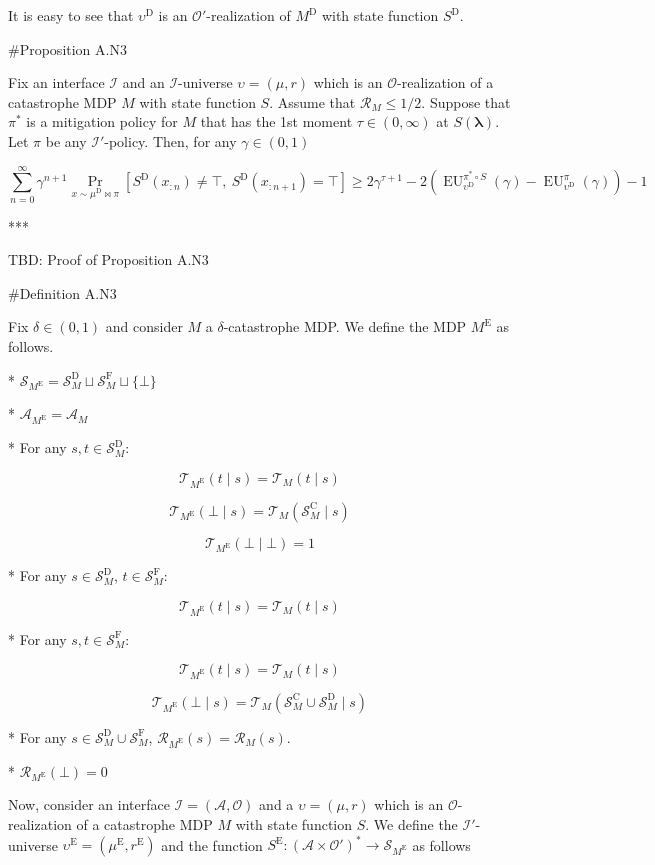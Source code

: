\documentclass[a4paper]{article}
\newcommand{\Comment}[1]{}
\newcommand{\AP}[1]{\left(#1\right)}
\newcommand{\AB}[1]{\left[#1\right]}
\newcommand{\Pa}[2]{\underset{#1}{\operatorname{Pr}}\AB{#2}}
\newcommand{\Estr}{\boldsymbol{\lambda}}
\newcommand{\M}{\xrightarrow{\textnormal{k}}}
\newcommand{\Ob}{\mathcal{O}}
\newcommand{\A}{\mathcal{A}}
\newcommand{\St}{\mathcal{S}}
\newcommand{\T}{\mathcal{T}}
\newcommand{\R}{\mathcal{R}}
\newcommand{\In}{\mathcal{I}}
\newcommand{\RMC}{\mathrm{C}}
\newcommand{\RMD}{\mathrm{D}}
\newcommand{\RME}{\mathrm{E}}
\newcommand{\RMF}{\mathrm{F}}
\newcommand{\SF}{\St^{\RMF}}
\newcommand{\SD}{\St^{\RMD}}
\newcommand{\SC}{\St^{\RMC}}
\newcommand{\MD}{M^{\RMD}}
\newcommand{\ME}{M^{\RME}}
\newcommand{\PD}{\pi^{\RMD}}
\newcommand{\UD}{\upsilon^{\RMD}}
\newcommand{\EU}{\operatorname{EU}}
\begin{document}
It is easy to see that $\UD$ is an $\Ob'$-realization of $\MD$ with state function $S^\RMD$.

\Comment{Given $\pi: \St_M \M \A_M$, we define $\PD: \St_{\MD} \M \A_M$ by

* For any $s \in \SD_M$, $\PD(s) = \pi(s)$.

* For $s \in \{\bot,\top\}$, $\PD(s)$ is arbitrary (because of how $\T_{\MD}$ is defined, the choice affects nothing).}

\#Proposition A.N3

Fix an interface $\In$ and an $\In$-universe $\upsilon=(\mu,r)$ which is an $\Ob$-realization of a catastrophe MDP $M$ with state function $S$. Assume that $\R_M \leq 1/2$. Suppose that $\pi^*$ is a mitigation policy for $M$ that has the 1st moment $\tau\in(0,\infty)$ at $S(\Estr)$. Let $\pi$ be any $\In'$-policy. Then, for any $\gamma\in(0,1)$

$$\sum_{n=0}^\infty \gamma^{n+1} \Pa{x \sim \mu^\RMD \bowtie \pi}{S^\RMD\AP{x_{:n}}\ne\top,\ S^\RMD\AP{x_{:n+1}}=\top} \geq 2{\gamma^{\tau+1}}-2\AP{\EU_{\UD}^{\pi^* \circ S}(\gamma)-\EU_{\UD}^{\pi}(\gamma)}-1$$

***

TBD: Proof of Proposition A.N3

\#Definition A.N3

Fix $\delta\in(0,1)$ and consider $M$ a $\delta$-catastrophe MDP. We define the MDP $\ME$ as follows.

* $\St_{\ME} = \SD_M \sqcup \SF_M \sqcup \{\bot\}$

* $\A_{\ME} = \A_M$

* For any $s,t \in \SD_M$:

$$\T_{\ME}(t \mid s) = \T_M(t \mid s)$$

$$\T_{\ME}(\bot \mid s) = \T_M(\SC_M \mid s)$$

$$\T_{\ME}(\bot \mid \bot) = 1$$

* For any $s \in \SD_M$, $t \in \SF_M$:

$$\T_{\ME}(t \mid s) = \T_M(t \mid s)$$

* For any $s,t \in \SF_M$:

$$\T_{\ME}(t \mid s) = \T_M(t \mid s)$$

$$\T_{\ME}(\bot \mid s) = \T_M(\SC_M \cup \SD_M \mid s)$$

* For any $s \in \SD_M \cup \SF_M$, $\R_{\ME}(s) = \R_M(s)$.

* $\R_{\ME}(\bot) = 0$

Now, consider an interface $\In=(\A,\Ob)$ and a $\upsilon=(\mu,r)$ which is an $\Ob$-realization of a catastrophe MDP $M$ with state function $S$. We define the $\In'$-universe $\upsilon^\RME=(\mu^\RME,r^\RME)$ and the function $S^\RME: \AP{\A \times \Ob'}^* \rightarrow \St_{\ME}$ as follows
\end{document}
